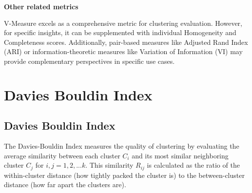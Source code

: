 \clearpage

\thispagestyle{customstyle}

\textbf{Other related metrics}

V-Measure excels as a comprehensive metric for clustering evaluation. However, for specific insights, it can be supplemented with
individual Homogeneity and Completeness scores. Additionally, pair-based measures like Adjusted Rand Index (ARI) or
information-theoretic measures like Variation of Information (VI) may provide complementary perspectives in specific use cases​.

\clearpage
\thispagestyle{clusteringstyle}
\section{Davies Bouldin Index}
\subsection{Davies Bouldin Index}

The Davies-Bouldin Index measures the quality of clustering by evaluating the average similarity between each cluster \( C_i \) and its most similar neighboring cluster 
\( C_j \) for $i,j = 1, 2, ... k$. This similarity \( R_{ij} \) is calculated as the ratio of the within-cluster distance (how tightly packed the cluster is) to the between-cluster distance (how far apart the clusters are).



